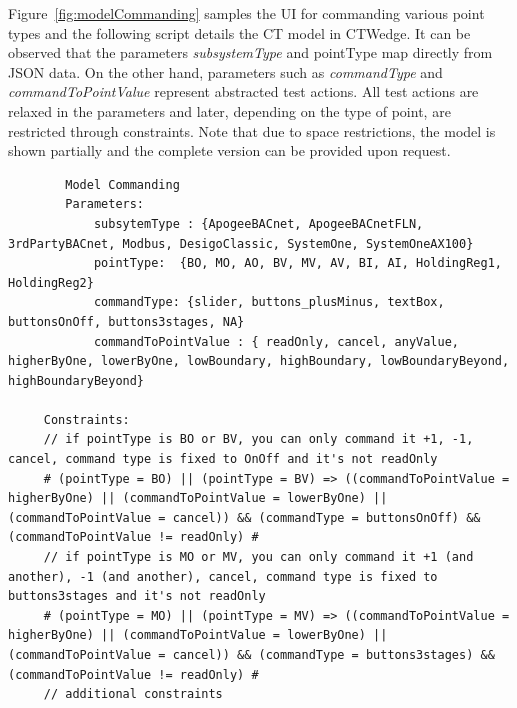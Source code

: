 \documentclass[conference]{IEEEtran}
\begin{document}
	Figure~\ref{fig:modelCommanding} samples the UI for commanding various point types and the following script details the CT model in CTWedge.
	It can be observed that the parameters \emph{subsystemType} and \emph{}{pointType} map directly from JSON data.
	On the other hand, parameters such as \emph{commandType} and \emph{commandToPointValue} represent abstracted test actions.
	All test actions are relaxed in the parameters and later, depending on the type of point, are restricted through constraints.
	Note that due to space restrictions, the model is shown partially and the complete version can be provided upon request.
	
	\begin{lstlisting}
		Model Commanding
		Parameters:
			subsytemType : {ApogeeBACnet, ApogeeBACnetFLN, 3rdPartyBACnet, Modbus, DesigoClassic, SystemOne, SystemOneAX100}
			pointType:  {BO, MO, AO, BV, MV, AV, BI, AI, HoldingReg1, HoldingReg2}  
			commandType: {slider, buttons_plusMinus, textBox, buttonsOnOff, buttons3stages, NA}
			commandToPointValue : { readOnly, cancel, anyValue, higherByOne, lowerByOne, lowBoundary, highBoundary, lowBoundaryBeyond, highBoundaryBeyond}
			
	 Constraints:
	 // if pointType is BO or BV, you can only command it +1, -1, cancel, command type is fixed to OnOff and it's not readOnly
	 # (pointType = BO) || (pointType = BV) => ((commandToPointValue = higherByOne) || (commandToPointValue = lowerByOne) || (commandToPointValue = cancel)) && (commandType = buttonsOnOff) && (commandToPointValue != readOnly) # 
	 // if pointType is MO or MV, you can only command it +1 (and another), -1 (and another), cancel, command type is fixed to buttons3stages and it's not readOnly
	 # (pointType = MO) || (pointType = MV) => ((commandToPointValue = higherByOne) || (commandToPointValue = lowerByOne) || (commandToPointValue = cancel)) && (commandType = buttons3stages) && (commandToPointValue != readOnly) # 
	 // additional constraints
	\end{lstlisting}
\end{document}
